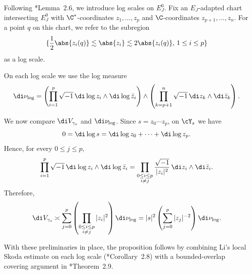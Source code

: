 \documentclass[12pt]{amsart}
\begin{document}
Following \cite{Li2024}*{Lemma~2.6}, we 
introduce {log scales} 
on $E^0_J$. Fix an {$E_J$-adapted chart} intersecting $E_J^0$
with $\C^\ast$-coordinates $z_1, \dots, z_p$ and 
$\C$-coordinates $z_{p+1}, \dots, z_n$. For 
a point $q$ on this chart, we refer to the subregion
\[
\{\frac{1}{2}\abs{z_i(q)} \lesssim \abs{z_i}
\lesssim 2 \abs{z_i(q)}, \, 1 \leq i \leq p\}
\]
as a {log scale}.

On each log scale we use the {log measure}
\[
\di \nu_{\log}
=
\left(
\prod_{i=1}^p
\sqrt{-1}\,\di \log z_i\wedge \di \log \bar z_i
\right)
\wedge
\left(
\prod_{k=p+1}^n
\sqrt{-1}\,\di z_k\wedge \di \bar z_k
\right).
\]

We now compare $\di V_{\gamma_s}$ and $\di\nu_{\log}$. Since
$s=z_0\cdots z_p$, on $\cY_s$ we have
\[
0=\di\log s=\di\log z_0+\cdots+\di\log z_p.
\]
Hence, for every $0\le j\le p$,
\[
\prod_{i=1}^p
\sqrt{-1}\,\di \log z_i\wedge \di \log \bar z_i
=
\prod_{\substack{0\le i\le p\\ i\neq j}}
\frac{\sqrt{-1}}{|z_i|^2}\,
\di z_i\wedge \di \bar z_i.
\]
Therefore,
\begin{equation}
\label{eqn:relation-volume-log-measure}
\di V_{\gamma_s}
\asymp
\sum_{j=0}^p
\left(
\prod_{\substack{0\le i\le p\\ i\neq j}}
|z_i|^2
\right)
\di\nu_{\log}
=
|s|^2
\left(
\sum_{j=0}^p |z_j|^{-2}
\right)
\di\nu_{\log}.
\end{equation}

With these preliminaries in place, the proposition follows by combining Li's
local Skoda estimate on each log scale (\cite{Li2024}*{Corollary~2.8}) with a bounded-overlap covering argument in \cite{Li2024}*{Theorem~2.9}.
\end{document}
